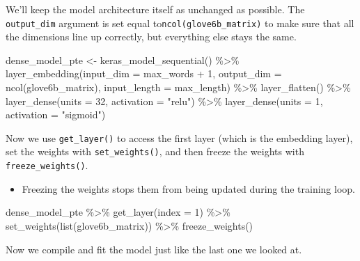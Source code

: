 \documentclass[
]{krantz}
\makeatletter
\newenvironment{Shaded}{\begin{snugshade}}{\end{snugshade}}
\newcommand{\AttributeTok}[1]{\textcolor[rgb]{0.77,0.63,0.00}{#1}}
\newcommand{\DecValTok}[1]{\textcolor[rgb]{0.00,0.00,0.81}{#1}}
\newcommand{\FunctionTok}[1]{\textcolor[rgb]{0.00,0.00,0.00}{#1}}
\newcommand{\NormalTok}[1]{#1}
\newcommand{\OtherTok}[1]{\textcolor[rgb]{0.56,0.35,0.01}{#1}}
\newcommand{\SpecialCharTok}[1]{\textcolor[rgb]{0.00,0.00,0.00}{#1}}
\newcommand{\StringTok}[1]{\textcolor[rgb]{0.31,0.60,0.02}{#1}}
\newenvironment{kframe}{%
\medskip{}
\setlength{\fboxsep}{.8em}
 \def\at@end@of@kframe{}%
 \ifinner\ifhmode%
  \def\at@end@of@kframe{\end{minipage}}%
  \begin{minipage}{\columnwidth}%
 \fi\fi%
 \def\FrameCommand##1{\hskip\@totalleftmargin \hskip-\fboxsep
 \colorbox{shadecolor}{##1}\hskip-\fboxsep
     \hskip-\linewidth \hskip-\@totalleftmargin \hskip\columnwidth}%
 \MakeFramed {\advance\hsize-\width
   \@totalleftmargin\z@ \linewidth\hsize
   \@setminipage}}%
 {\par\unskip\endMakeFramed%
 \at@end@of@kframe}
\renewenvironment{Shaded}{\begin{kframe}}{\end{kframe}}
\newenvironment{rmdblock}[1]
  {\begin{shaded*}
  \begin{itemize}[left = -1cm, labelsep = 1cm]
  \renewcommand{\labelitemi}{
    \raisebox{-.7\height}[0pt][0pt]{
      {\setkeys{Gin}{width=3em,keepaspectratio}\texttt{[image: images/\#1]}}
    }
  }
 
  \item
  }
  {
  \end{itemize}
  \end{shaded*}
  }
\newenvironment{rmdnote}
  {\begin{rmdblock}{note}}
  {\end{rmdblock}}
\makeatother
\begin{document}
We'll keep the model architecture itself as unchanged as possible. The \texttt{output\_dim} argument is set equal to\texttt{ncol(glove6b\_matrix)} to make sure that all the dimensions line up correctly, but everything else stays the same.

\begin{Shaded}
\begin{Highlighting}[]
\NormalTok{dense\_model\_pte }\OtherTok{\textless{}{-}} \FunctionTok{keras\_model\_sequential}\NormalTok{() }\SpecialCharTok{\%\textgreater{}\%}
  \FunctionTok{layer\_embedding}\NormalTok{(}\AttributeTok{input\_dim =}\NormalTok{ max\_words }\SpecialCharTok{+} \DecValTok{1}\NormalTok{,}
                  \AttributeTok{output\_dim =} \FunctionTok{ncol}\NormalTok{(glove6b\_matrix),}
                  \AttributeTok{input\_length =}\NormalTok{ max\_length) }\SpecialCharTok{\%\textgreater{}\%}
  \FunctionTok{layer\_flatten}\NormalTok{() }\SpecialCharTok{\%\textgreater{}\%}
  \FunctionTok{layer\_dense}\NormalTok{(}\AttributeTok{units =} \DecValTok{32}\NormalTok{, }\AttributeTok{activation =} \StringTok{"relu"}\NormalTok{) }\SpecialCharTok{\%\textgreater{}\%}
  \FunctionTok{layer\_dense}\NormalTok{(}\AttributeTok{units =} \DecValTok{1}\NormalTok{, }\AttributeTok{activation =} \StringTok{"sigmoid"}\NormalTok{)}
\end{Highlighting}
\end{Shaded}

Now we use \texttt{get\_layer()} to access the first layer (which is the embedding layer), set the weights with \texttt{set\_weights()}, and then freeze the weights with \texttt{freeze\_weights()}.

\begin{rmdnote}
Freezing the weights stops them from being updated during the training
loop.
\end{rmdnote}

\begin{Shaded}
\begin{Highlighting}[]
\NormalTok{dense\_model\_pte }\SpecialCharTok{\%\textgreater{}\%}
  \FunctionTok{get\_layer}\NormalTok{(}\AttributeTok{index =} \DecValTok{1}\NormalTok{) }\SpecialCharTok{\%\textgreater{}\%}
  \FunctionTok{set\_weights}\NormalTok{(}\FunctionTok{list}\NormalTok{(glove6b\_matrix)) }\SpecialCharTok{\%\textgreater{}\%}
  \FunctionTok{freeze\_weights}\NormalTok{()}
\end{Highlighting}
\end{Shaded}

Now we compile and fit the model just like the last one we looked at.
\end{document}

